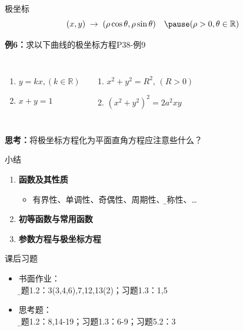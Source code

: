 \begin{frame}{极坐标}
	\linespread{1.5}\pause 
	$$(x,y)\;\to\;(\rho\cos\theta,\rho\sin\theta)\quad\pause
	(\rho>0,\theta\in\mathbb{R})$$\pause
	\begin{exampleblock}{{\bf 例6：}求以下曲线的极坐标方程\hfill P38-例9}
		\vspace{-1ex}
		\begin{columns}
				\begin{enumerate}
				  \item $y=kx,(k\in\mathbb{R})$
				  \item $x+y=1$
				\end{enumerate}
				\begin{enumerate}
				  \addtocounter{enumi}{2}
				  \item $x^2+y^2=R^2,\,(R>0)$
				  \item $(x^2+y^2)^2=2a^2xy$
				\end{enumerate}
		\end{columns}
	\end{exampleblock}\pause
	\bigskip
	\alert{\bf 思考：}将极坐标方程化为平面直角方程应注意些什么？
\end{frame}


\begin{frame}[<+->]{小结}
	\linespread{1.3}
	\begin{enumerate}
	  \item {\bf 函数及其性质}
	  \begin{itemize}
	    \item 有界性、单调性、奇偶性、周期性、{\b 对称性}、\ldots
	  \end{itemize}
	  \item {\bf 初等函数与常用函数}
	  \item {\bf 参数方程与极坐标方程}
	\end{enumerate}
	\pause
	\pause
	\begin{exampleblock}{课后习题}
	  \begin{itemize}
	    \item 书面作业：\\
	    {\small\b 习题1.2：3(3,4,6),7,12,13(2)；习题1.3：1,5}
	    \item 思考题：\\
	    {\small\b 习题1.2：8,14-19；习题1.3：6-9；习题5.2：3}
	  \end{itemize}
	\end{exampleblock}
\end{frame}

